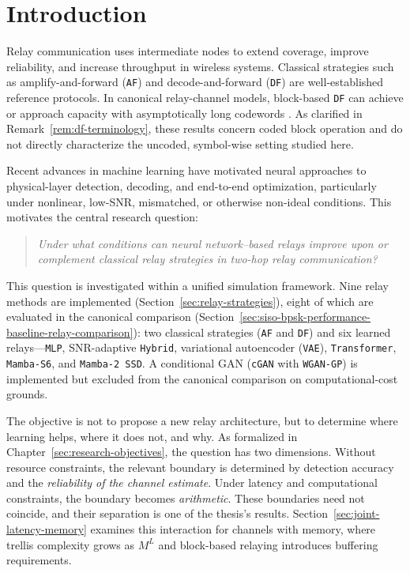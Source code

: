\chapter{Introduction}\label{sec:introduction}

Relay communication uses intermediate nodes to extend coverage, improve reliability, and increase throughput in wireless systems. Classical strategies such as amplify-and-forward (\texttt{AF}) and decode-and-forward (\texttt{DF}) are well-established reference protocols. In canonical relay-channel models, block-based \texttt{DF} can achieve or approach capacity with asymptotically long codewords \cite{CoverGamal1979RelayChannel,ElGamalKim2011NetworkIT,Laneman2004CooperativeDiversity,RankovWittneben2007HalfDuplexRelay,Nosratinia2004CooperativeCommunication}. As clarified in Remark~\ref{rem:df-terminology}, these results concern coded block operation and do not directly characterize the uncoded, symbol-wise setting studied here.

Recent advances in machine learning have motivated neural approaches to physical-layer detection, decoding, and end-to-end optimization, particularly under nonlinear, low-SNR, mismatched, or otherwise non-ideal conditions. This motivates the central research question:

\begin{quote}
\emph{Under what conditions can neural network--based relays improve upon or complement classical relay strategies in two-hop relay communication?}
\end{quote}

This question is investigated within a unified simulation framework. Nine relay methods are implemented (Section~\ref{sec:relay-strategies}), eight of which are evaluated in the canonical comparison (Section~\ref{sec:siso-bpsk-performance-baseline-relay-comparison}): two classical strategies (\texttt{AF} and \texttt{DF}) and six learned relays---\texttt{MLP}, SNR-adaptive \texttt{Hybrid}, variational autoencoder (\texttt{VAE}), \texttt{Transformer}, \texttt{Mamba-S6}, and \texttt{Mamba-2 SSD}. A conditional GAN (\texttt{cGAN} with \texttt{WGAN-GP}) is implemented but excluded from the canonical comparison on computational-cost grounds.

The objective is not to propose a new relay architecture, but to determine where learning helps, where it does not, and why. As formalized in Chapter~\ref{sec:research-objectives}, the question has two dimensions. Without resource constraints, the relevant boundary is determined by detection accuracy and the \emph{reliability of the channel estimate}. Under latency and computational constraints, the boundary becomes \emph{arithmetic}. These boundaries need not coincide, and their separation is one of the thesis's results. Section~\ref{sec:joint-latency-memory} examines this interaction for channels with memory, where trellis complexity grows as $M^{L}$ and block-based relaying introduces buffering requirements.

